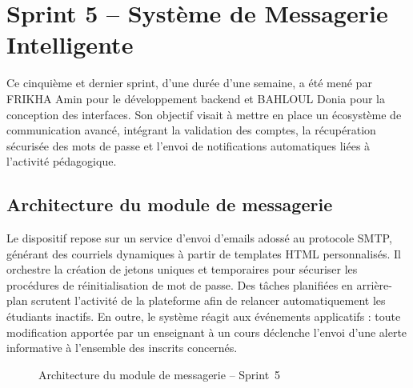 \documentclass[12pt,a4paper]{report}
\begin{document}
\newpage

\section{Sprint 5 -- Système de Messagerie Intelligente}

Ce cinquième et dernier sprint, d'une durée d'une semaine, a été mené par FRIKHA Amin pour le développement backend et BAHLOUL Donia pour la conception des interfaces. Son objectif visait à mettre en place un écosystème de communication avancé, intégrant la validation des comptes, la récupération sécurisée des mots de passe et l'envoi de notifications automatiques liées à l'activité pédagogique.

\subsection{Architecture du module de messagerie}

Le dispositif repose sur un service d'envoi d'emails adossé au protocole SMTP, générant des courriels dynamiques à partir de templates HTML personnalisés. Il orchestre la création de jetons uniques et temporaires pour sécuriser les procédures de réinitialisation de mot de passe. Des tâches planifiées en arrière-plan scrutent l'activité de la plateforme afin de relancer automatiquement les étudiants inactifs. En outre, le système réagit aux événements applicatifs : toute modification apportée par un enseignant à un cours déclenche l'envoi d'une alerte informative à l'ensemble des inscrits concernés.

\begin{figure}[H]
\centering
{}
\caption{Architecture du module de messagerie -- Sprint~5}
\end{figure}
\end{document}
